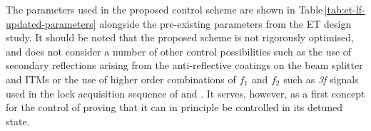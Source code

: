 The parameters used in the proposed control scheme are shown in Table\,\ref{tab:et-lf-updated-parameters} alongside the pre-existing parameters from the \gls{ET} design study. It should be noted that the proposed scheme is not rigorously optimised, and does not consider a number of other control possibilities such as the use of secondary reflections arising from the anti-reflective coatings on the beam splitter and \glspl{ITM} or the use of higher order combinations of $f_1$ and $f_2$ such as \emph{3f} signals used in the lock acquisition sequence of \VIRGO{} \cite{Acernese2008} and \ALIGO{} \cite{Staley2014}. It serves, however, as a first concept for the control of \ETLF{} proving that it can in principle be controlled in its detuned state.

\begin{table}
  \centering
\end{table}
